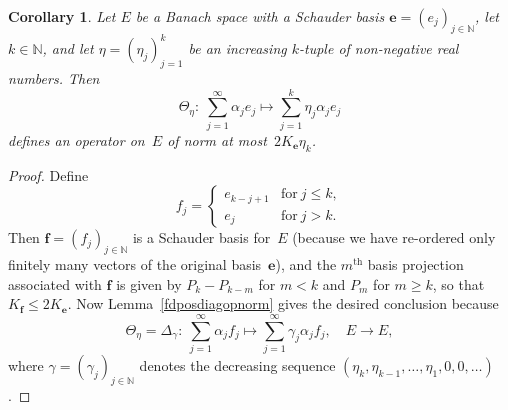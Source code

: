 \documentclass[12pt]{amsart}
\newtheorem{corollary}[theorem]{Corollary}
\theoremstyle{definition}
\numberwithin{equation}{section}
\begin{document}
\begin{corollary}\label{posdiagopinfdim}
  Let $E$ be a Banach space with a Schauder basis $\mathbf{e} =
  (e_j)_{j\in{\ensuremath{\mathbb{N}}}}$, let $k\in{\ensuremath{\mathbb{N}}}$, and let $\eta = (\eta_j)_{j=1}^k$ be
  an increasing $k$-tuple of non-negative real numbers. Then
  \begin{equation}\label{posdiagopinfdimEq1}
    \Theta_\eta\colon\ \sum_{j=1}^\infty\alpha_j e_j\mapsto
    \sum_{j=1}^k\eta_j\alpha_j e_j \end{equation}
  defines an operator on~$E$ of norm at most~$2K_{\mathbf{e}}\eta_k$.
\end{corollary}
\begin{proof}
  Define \[ f_j = \begin{cases} e_{k-j+1} &\text{for}\ j{\ensuremath{\leqslant}} k,\\ e_j
    &\text{for}\ j>k.\end{cases} \] Then $\mathbf{f} = (f_j)_{j\in{\ensuremath{\mathbb{N}}}}$
  is a Schauder basis for~$E$ (because we have re-ordered only finitely
  many vectors of the original basis~$\mathbf{e}$), and the
  $m^{\text{th}}$ basis projection associated with $\mathbf{f}$ is
  given by $P_k - P_{k-m}$ for $m < k$ and $P_m$ for $m{\ensuremath{\geqslant}} k$, so that
  $K_{\mathbf{f}}{\ensuremath{\leqslant}} 2K_{\mathbf{e}}$. Now Lemma~\ref{fdposdiagopnorm}
  gives the desired conclusion because \[ \Theta_\eta =
  \Delta_\gamma\colon\ \sum_{j=1}^\infty \alpha_j
  f_j\mapsto\sum_{j=1}^\infty \gamma_j\alpha_j f_j,\quad E\to E, \]
  where $\gamma=(\gamma_j)_{j\in{\ensuremath{\mathbb{N}}}}$ denotes the decreasing sequence
  $(\eta_k, \eta_{k-1},\ldots,\eta_1,0,0,\ldots)$.
\end{proof}
\end{document}
